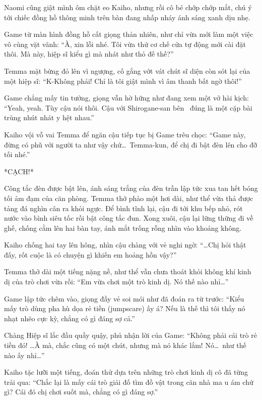 \documentclass[../main.tex]{subfiles}
\begin{document}

Naomi cũng giật mình ôm chặt eo Kaiho, nhưng rồi cô bé chớp chớp mắt, chú ý tới chiếc đồng hồ thông minh trên bàn đang nhấp nháy ánh sáng xanh dịu nhẹ.

Game từ màn hình đồng hồ cất giọng thản nhiên, như chỉ vừa mới làm một việc vô cùng vặt vãnh: ``À, xin lỗi nhé. Tôi vừa thử cơ chế cửa tự động mới cài đặt thôi. Mà này, hiệp sĩ kiểu gì mà nhát như thỏ đế thế?''

Temma mặt bừng đỏ lên vì ngượng, cố gắng vớt vát chút sĩ diện còn sót lại của một hiệp sĩ: ``K-Không phải! Chỉ là tôi giật mình vì âm thanh bất ngờ thôi!''

Game chẳng mấy tin tưởng, giọng vẫn hờ hững như đang xem một vở hài kịch: ``Yeah, yeah. Tùy cậu nói thôi. Cậu với Shirogane-san bên \hll\ đúng là một cặp bài trùng nhút nhát y hệt nhau.''

Kaiho vội vỗ vai Temma để ngăn cậu tiếp tục bị Game trêu chọc: ``Game này, đừng có phũ với người ta như vậy chứ\dots\ Temma-kun, để chị đi bật đèn lên cho đỡ tối nhé.''

*CẠCH!*

Công tắc đèn được bật lên, ánh sáng trắng của đèn trần lập tức xua tan hết bóng tối ảm đạm của căn phòng. Temma thở phào một hơi dài, như thể vừa thả được tảng đá nghìn cân ra khỏi ngực. Để bình tĩnh lại, cậu đi tới khu bếp nhỏ, rót nước vào bình siêu tốc rồi bật công tắc đun. Xong xuôi, cậu lại lững thững đi về ghế, chống cằm lên hai bàn tay, ánh mắt trống rỗng nhìn vào khoảng không.


Kaiho chống hai tay lên hông, nhìn cậu chàng với vẻ nghi ngờ: ``\dots Chị hỏi thật đấy, rốt cuộc là có chuyện gì khiến em hoảng hồn vậy?''

Temma thở dài một tiếng nặng nề, như thể vẫn chưa thoát khỏi không khí kinh dị của trò chơi vừa rồi: ``Em vừa chơi một trò kinh dị. Nó thế nào nhỉ\dots''

Game lập tức chêm vào, giọng đầy vẻ soi mói như đã đoán ra từ trước: ``Kiểu mấy trò dùng pha hù dọa rẻ tiền (jumpscare) ấy á? Nếu là thế thì tôi thấy nó nhạt nhẽo cực kỳ, chẳng có gì đáng sợ cả.''

Chàng Hiệp sĩ lắc đầu quầy quậy, phủ nhận lời của Game: ``Không phải cái trò rẻ tiền đó! \dots À mà, chắc cũng có một chút, nhưng mà nó khác lắm! Nó\dots\ như thế nào ấy nhỉ\dots''

Kaiho tặc lưỡi một tiếng, đoán thử dựa trên những trò chơi kinh dị cô đã từng trải qua: ``Chắc lại là mấy cái trò giải đố tìm đồ vật trong căn nhà ma u ám chứ gì? Cái đó chị chơi suốt mà, chẳng có gì đáng sợ.''
\end{document}

